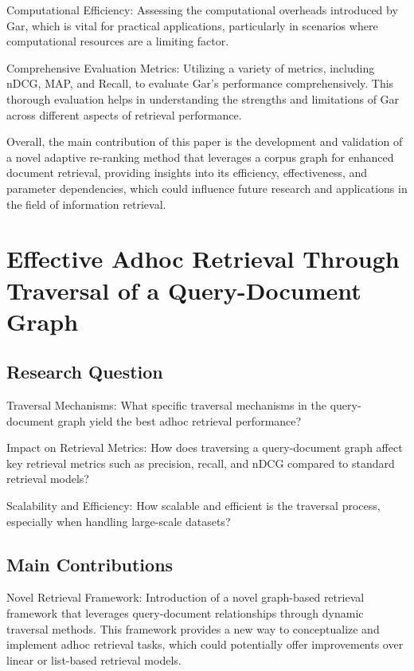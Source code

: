 \documentclass[sigconf,authorversion,nonacm]{acmart}
\begin{document}
Computational Efficiency: Assessing the computational overheads introduced by Gar, which is vital
for practical applications, particularly in scenarios where computational resources are a limiting
factor.

Comprehensive Evaluation Metrics: Utilizing a variety of metrics, including nDCG, MAP, and Recall,
to evaluate Gar’s performance comprehensively. This thorough evaluation helps in understanding the
strengths and limitations of Gar across different aspects of retrieval performance.

Overall, the main contribution of this paper is the development and validation of a novel adaptive
re-ranking method that leverages a corpus graph for enhanced document retrieval, providing insights
into its efficiency, effectiveness, and parameter dependencies, which could influence future
research and applications in the field of information retrieval.
\section{Effective Adhoc Retrieval Through Traversal of a Query-Document Graph}

\subsection{Research Question}

Traversal Mechanisms: What specific traversal mechanisms in the query-document graph yield the best
adhoc retrieval performance?

Impact on Retrieval Metrics: How does traversing a query-document graph affect key retrieval metrics
such as precision, recall, and nDCG compared to standard retrieval models?

Scalability and Efficiency: How scalable and efficient is the traversal process, especially when
handling large-scale datasets?

\subsection{Main Contributions}

Novel Retrieval Framework: Introduction of a novel graph-based retrieval framework that leverages
query-document relationships through dynamic traversal methods. This framework provides a new way to
conceptualize and implement adhoc retrieval tasks, which could potentially offer improvements over
linear or list-based retrieval models.
\end{document}
